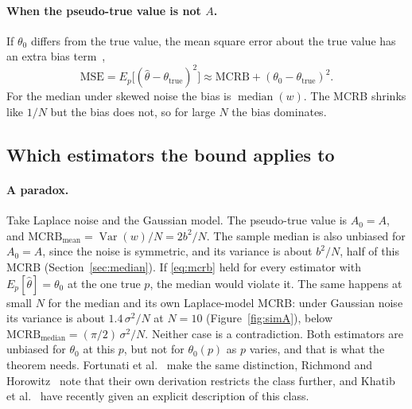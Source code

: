 \documentclass[11pt]{article}
\numberwithin{figure}{section}
\numberwithin{equation}{section}
\begin{document}
\paragraph{When the pseudo-true value is not $A$.} If $\theta_0$ differs from the true value, the mean
square error about the true value has an extra bias term~\cite[Section~3.4]{fortunati},
\[
  \text{MSE} = E_p\big[(\hat\theta - \theta_{\text{true}})^2\big] \approx \text{MCRB} + (\theta_0 - \theta_{\text{true}})^2 .
\]
For the median under skewed noise the bias is $\operatorname{median}(w)$. The MCRB shrinks like $1/N$
but the bias does not, so for large $N$ the bias dominates.

\subsection{Which estimators the bound applies to}
\label{sec:mcrb-class}

\paragraph{A paradox.} Take Laplace noise and the Gaussian model. The pseudo-true value is
$A_0 = A$, and $\text{MCRB}_{\text{mean}} = \operatorname{Var}(w)/N = 2b^2/N$. The sample median is also
unbiased for $A_0 = A$, since the noise is symmetric, and its variance is about $b^2/N$, half of this
MCRB (Section~\ref{sec:median}). If \eqref{eq:mcrb} held for every estimator with
$E_p[\hat\theta] = \theta_0$ at the one true $p$, the median would violate it. The same happens at small
$N$ for the median and its own Laplace-model MCRB: under Gaussian noise its variance is about
$1.4\,\sigma^2/N$ at $N = 10$ (Figure~\ref{fig:simA}), below $\text{MCRB}_{\text{median}} =
(\pi/2)\,\sigma^2/N$. Neither case is a contradiction. Both estimators are unbiased for $\theta_0$ at
this $p$, but not for $\theta_0(p)$ as $p$ varies, and that is what the theorem needs. Fortunati et
al.~\cite{fortunati2016} make the same distinction, Richmond and Horowitz~\cite{richmond} note that
their own derivation restricts the class further, and Khatib et al.~\cite{khatib2026} have recently
given an explicit description of this class.
\end{document}
